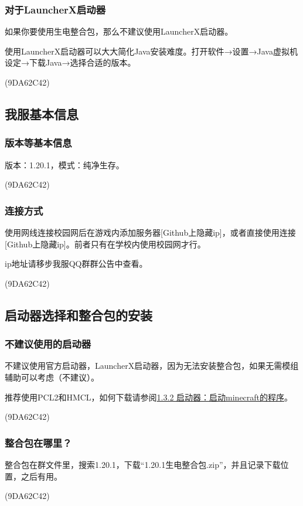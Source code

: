 \documentclass[UTF8,a4paper]{article}
\begin{document}
			\subsubsection{对于LauncherX启动器}
				\par 如果你要使用生电整合包，那么不建议使用LauncherX启动器。
				\par 使用LauncherX启动器可以大大简化Java安装难度。打开软件→设置→Java虚拟机设定→下载Java→选择合适的版本。
				\begin{flushright}(9DA62C42)\end{flushright}
		\subsection{我服基本信息}
			\subsubsection{版本等基本信息}
				\par 版本：1.20.1，模式：纯净生存。
				\begin{flushright}(9DA62C42)\end{flushright}
			\subsubsection{连接方式}
				\par 使用网线连接校园网后在游戏内添加服务器[Github上隐藏ip]，或者直接使用连接[Github上隐藏ip]。前者只有在学校内使用校园网才行。
				\par ip地址请移步我服QQ群群公告中查看。
				\begin{flushright}(9DA62C42)\end{flushright}
		\subsection{启动器选择和整合包的安装}
			\hypertarget{2.3}{}
			\subsubsection{不建议使用的启动器}
				\par 不建议使用官方启动器，LauncherX启动器，因为无法安装整合包，如果无需模组辅助可以考虑（不建议）。
				\par 推荐使用PCL2和HMCL，如何下载请参阅\hyperlink{1.3.2}{1.3.2 启动器：启动minecraft的程序}。
				\begin{flushright}(9DA62C42)\end{flushright}
			\subsubsection{整合包在哪里？}
				\par 整合包在群文件里，搜索1.20.1，下载“1.20.1生电整合包.zip”，并且记录下载位置，之后有用。
				\begin{flushright}(9DA62C42)\end{flushright}
\end{document}
